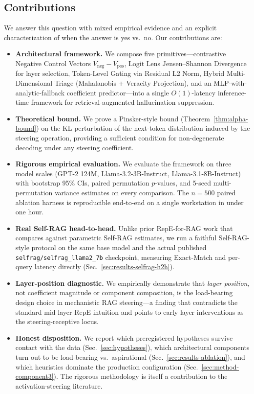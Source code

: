 \documentclass[conference]{IEEEtran}
\begin{document}
\subsection{Contributions}

We answer this question with mixed empirical evidence and an explicit characterization of when the answer is yes vs.\ no. Our contributions are:

\begin{itemize}
    \item \textbf{Architectural framework.} We compose five primitives---contrastive Negative Control Vectors $V_{\text{neg}}-V_{\text{pos}}$, Logit Lens Jensen--Shannon Divergence for layer selection, Token-Level Gating via Residual L2 Norm, Hybrid Multi-Dimensional Triage (Mahalanobis $+$ Veracity Projection), and an MLP-with-analytic-fallback coefficient predictor---into a single $O(1)$-latency inference-time framework for retrieval-augmented hallucination suppression.
    \item \textbf{Theoretical bound.} We prove a Pinsker-style bound (Theorem~\ref{thm:alpha-bound}) on the KL perturbation of the next-token distribution induced by the steering operation, providing a sufficient condition for non-degenerate decoding under any steering coefficient.
    \item \textbf{Rigorous empirical evaluation.} We evaluate the framework on three model scales (GPT-2 124M, Llama-3.2-3B-Instruct, Llama-3.1-8B-Instruct) with bootstrap 95\% CIs, paired permutation $p$-values, and 5-seed multi-permutation variance estimates on every comparison. The $n\!=\!500$ paired ablation harness is reproducible end-to-end on a single workstation in under one hour.
    \item \textbf{Real Self-RAG head-to-head.} Unlike prior RepE-for-RAG work that compares against parametric Self-RAG estimates, we run a faithful Self-RAG-style protocol on the same base model and the actual published \texttt{selfrag/selfrag\_llama2\_7b} checkpoint, measuring Exact-Match and per-query latency directly (Sec.~\ref{sec:results-selfrag-h2h}).
    \item \textbf{Layer-position diagnostic.} We empirically demonstrate that \emph{layer position}, not coefficient magnitude or component composition, is the load-bearing design choice in mechanistic RAG steering---a finding that contradicts the standard mid-layer RepE intuition and points to early-layer interventions as the steering-receptive locus.
    \item \textbf{Honest disposition.} We report which preregistered hypotheses survive contact with the data (Sec.~\ref{sec:hypotheses}), which architectural components turn out to be load-bearing vs.\ aspirational (Sec.~\ref{sec:results-ablation}), and which heuristics dominate the production configuration (Sec.~\ref{sec:method-component3}). The rigorous methodology is itself a contribution to the activation-steering literature.
\end{itemize}
\end{document}
